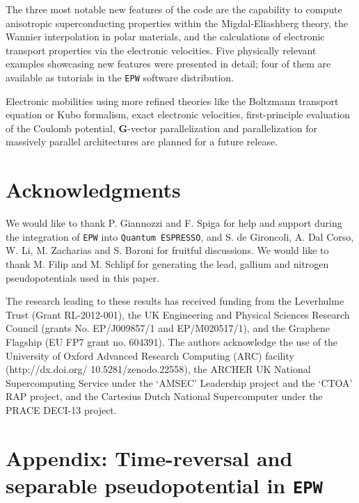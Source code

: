 \documentclass[final,3p,times,twocolumn]{elsarticle}
\begin{document}
The three most notable new features of the code are the capability to compute anisotropic superconducting properties within the Migdal-Eliashberg theory, the Wannier interpolation in polar materials, and the calculations of electronic transport properties via the electronic velocities. 
Five physically relevant examples showcasing new features were presented in detail; four of them are available as tutorials in the \texttt{EPW} software distribution. 

Electronic mobilities using more refined theories like the Boltzmann transport equation or Kubo formalism, exact electronic velocities, first-principle evaluation of the Coulomb potential, $\mathbf{G}$-vector parallelization and parallelization for massively parallel architectures are planned for a future release.



\section{Acknowledgments}
\label{Acknowledgments}
We would like to thank P. Giannozzi and F. Spiga for help and support during the integration of \texttt{EPW} into \texttt{Quantum ESPRESSO}, and S. de Gironcoli, A. Dal Corso, W. Li, M. Zacharias and S. Baroni for fruitful discussions. 
We would like to thank M. Filip and M. Schlipf for generating the lead, gallium and nitrogen pseudopotentials used in this paper. 


The research leading to these results has received funding from the Leverhulme Trust (Grant RL-2012-001), the UK Engineering and Physical
Sciences Research Council (grants No. EP/J009857/1 and EP/M020517/1), and the Graphene Flagship (EU FP7 grant no. 604391).
The authors acknowledge the use of the University of Oxford Advanced Research Computing (ARC) facility (http://dx.doi.org/
10.5281/zenodo.22558), the ARCHER UK National Supercomputing Service under the `AMSEC' Leadership project and the `CTOA' RAP project, and the Cartesius Dutch National Supercomputer under the PRACE DECI-13 project.






\section{Appendix: Time-reversal and separable pseudopotential in \texttt{EPW}}
\label{Appendix}
\end{document}

